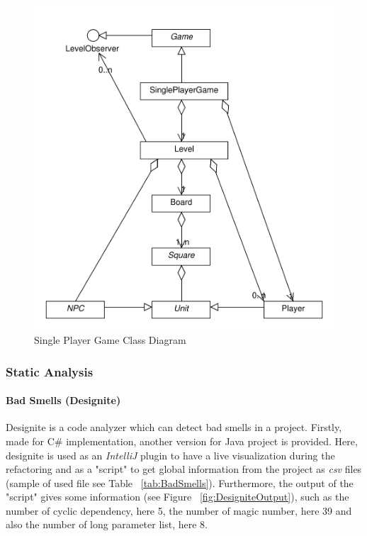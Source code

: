 \documentclass[]{article}
\begin{document}
\begin{figure}[h]
    \centering
    \includegraphics[scale=0.4]{imgs/SinglePlayerGame.pdf}
    \caption{Single Player Game Class Diagram}
    \label{fig:SinglePlayerGameClassDiagram}
\end{figure}

\subsubsection{Static Analysis}

\paragraph{Bad Smells (Designite)}

Designite is a code analyzer which can detect bad smells in a project. Firstly, made for C\# implementation, another version for Java project is provided. Here, designite is used as an \textit{IntelliJ} plugin to have a live visualization during the refactoring and as a "script" to get global information from the project as \textit{csv} files (sample of used file see Table ~\ref{tab:BadSmells}). Furthermore, the output of the "script" gives some information (see Figure ~\ref{fig:DesigniteOutput}), such as the number of cyclic dependency, here 5, the number of magic number, here 39 and also the number of long parameter list, here 8. \\
\end{document}
